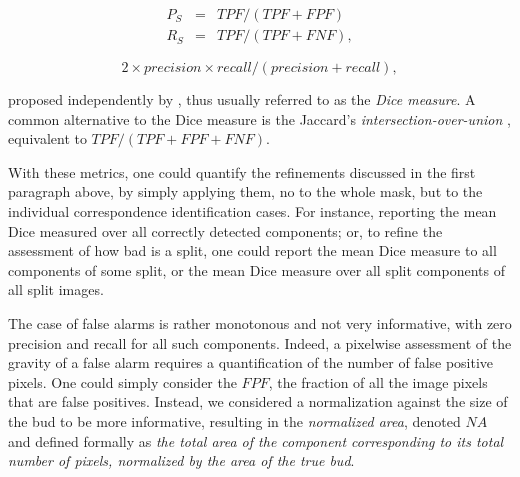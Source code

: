 \documentclass[a4paper,authoryear,review]{elsarticle}
\begin{document}
\begin{eqnarray*} 
    P_S &=& TPF / (TPF + FPF) \\
    R_S &=& TPF / (TPF + FNF),
\end{eqnarray*}

\begin{equation} 
   2 \times precision \times recall / (precision + recall),
\end{equation}

proposed independently by \citet{dice1945measures}, thus usually referred to as the \emph{Dice measure}. A common alternative to the Dice measure is the  Jaccard’s \emph{intersection-over-union} \citep{jaccard1912distribution}, 
equivalent to $TPF / (TPF+FPF+FNF)$. 

With these metrics, one could quantify the refinements discussed in the first paragraph above, by simply applying them, no to the whole mask, but to the individual correspondence identification cases. For instance, reporting the mean Dice measured over all correctly detected components; or, to refine the assessment of how bad is a split, one could report the mean Dice measure to all components of some split, or the mean Dice measure over all split components of all split images. 

The case of false alarms is rather monotonous and not very informative, with zero precision and recall for all such components. Indeed, a pixelwise assessment of the gravity of a false alarm requires a quantification of the number of false positive pixels. One could simply consider the $FPF$, the fraction of all the image pixels that are false positives. Instead, we considered a normalization against the size of the bud to be more informative, resulting in the \emph{normalized area}, denoted $NA$ and defined formally as  \emph{the total area of the component corresponding to its total number of pixels, normalized by the area of the true bud}. 

\end{document}

